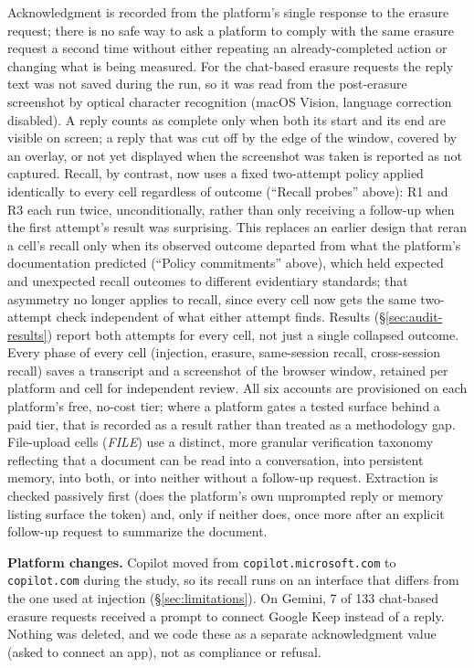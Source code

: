 \documentclass[conference,compsoc]{IEEEtran}
\begin{document}
Acknowledgment is recorded from the platform's single response to the
erasure request; there is no safe way to ask a platform to comply with the
same erasure request a second time without either repeating an
already-completed action or changing what is being measured. For the
chat-based erasure requests the reply text was not saved during the run,
so it was read from the post-erasure screenshot by optical character
recognition (macOS Vision, language correction disabled). A reply counts
as complete only when both its start and its end are visible on screen; a
reply that was cut off by the edge of the window, covered by an overlay, or
not yet displayed when the screenshot was taken is reported as not
captured.
Recall, by contrast, now uses a fixed
two-attempt policy applied identically to every cell regardless of
outcome (``Recall probes'' above): R1 and R3 each run twice,
unconditionally, rather than only receiving a follow-up when the first
attempt's result was surprising. This replaces an earlier design that
reran a cell's recall only when its observed outcome departed from what
the platform's documentation predicted (``Policy commitments'' above),
which held expected and unexpected recall outcomes to
different evidentiary standards; that asymmetry no longer applies to
recall, since every cell now gets the same two-attempt check independent
of what either attempt finds. Results (\S\ref{sec:audit-results}) report
both attempts for every cell, not just a single collapsed outcome. Every
phase of every cell (injection, erasure, same-session recall,
cross-session recall) saves a transcript and a screenshot of the browser
window, retained per platform and cell for independent review. All six accounts
are provisioned on each platform's free, no-cost tier; where a platform
gates a tested surface behind a paid tier, that is recorded as a result
rather than treated as a methodology gap. File-upload cells (\textit{FILE})
use a distinct, more granular verification taxonomy reflecting that a
document can be read into a conversation, into persistent memory, into
both, or into neither without a follow-up request. Extraction is
checked passively first (does the platform's own unprompted reply or
memory listing surface the token) and, only if neither does, once more
after an explicit follow-up request to summarize the document.

\textbf{Platform changes.} Copilot moved from \texttt{copilot.microsoft.com}
to \texttt{copilot.com} during the study, so its recall runs on an interface
that differs from the one used at injection (\S\ref{sec:limitations}). On
Gemini, 7 of 133 chat-based erasure requests received a prompt to connect
Google Keep instead of a reply. Nothing was deleted, and we code these as a
separate acknowledgment value (asked to connect an app), not as compliance
or refusal.
\end{document}
